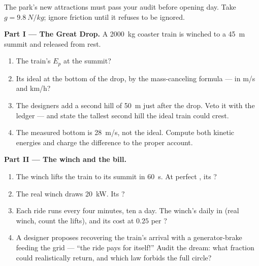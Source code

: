 \begin{problem}\label{pb:g9:energy-conversions:1}
The park's new attractions must pass your  audit
before opening day. Take $g = \qty{9.8}{N/kg}$; ignore
friction until it refuses to be ignored.

\medskip\noindent\textbf{Part I --- The Great Drop.}
A \qty{2000}{kg} coaster train is winched to a \qty{45}{m}
summit and released from rest.
\begin{enumerate}
  \item The train's $E_p$ at the summit?
  \item Its ideal  at the bottom of the drop, by the
        mass-canceling formula --- in \unit{m/s} and
        \unit{km/h}?
  \item The designers add a second hill of \qty{50}{m}
        just after the drop. Veto it with the ledger ---
        and state the tallest second hill the ideal train
        could crest.
  \item The measured bottom  is \qty{28}{m/s}, not
        the ideal. Compute both kinetic energies and
        charge the difference to the proper account.
\end{enumerate}

\medskip\noindent\textbf{Part II --- The winch and the
bill.}
\begin{enumerate}[resume]
  \item The winch lifts the train to its summit in
        \qty{60}{s}. At perfect , its ?
  \item The real winch draws \qty{20}{kW}. Its
        ?
  \item Each ride runs every four minutes, ten  a
        day. The winch's daily  in 
        (real winch, count the lifts), and its cost at
        $0.25$ per ?
  \item A designer proposes recovering the train's arrival
         with a generator-brake feeding the grid ---
        ``the ride pays for itself!'' Audit the dream:
        what fraction could realistically return, and
        which law forbids the full circle?
\end{enumerate}


\end{problem}
